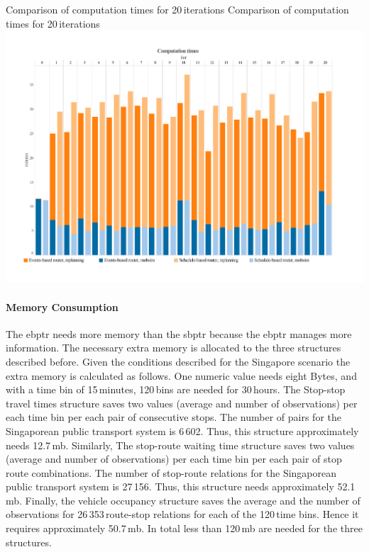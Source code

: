 \createfigure
{Comparison of computation times for 20\,iterations}
{Comparison of computation times for 20\,iterations}
{\label{fig:CompTimes}}
{\includegraphics[width=1.0\textwidth]{extending/figures/ebr/ComputationTimes.pdf}}
{}

\paragraph{Memory Consumption}

The \gls{ebptr} needs more memory than the \gls{sbptr} because the \gls{ebptr} manages more information. The necessary extra memory is allocated to the three structures described before. Given the conditions described for the Singapore scenario the extra memory is calculated as follows. One numeric value needs eight Bytes, and with a time bin of 15\,minutes, 120\,bins are needed for 30\,hours. The Stop-stop travel times structure saves two values (average and number of observations) per each time bin per each pair of consecutive stops. The number of pairs for the Singaporean public transport system is 6\,602. Thus, this structure approximately needs 12.7\,\gls{mb}. Similarly, The stop-route waiting time structure saves two values (average and number of observations) per each time bin per each pair of stop route combinations. The number of stop-route relations for the Singaporean public transport system is 27\,156. Thus, this structure needs approximately 52.1\,\gls{mb}. Finally, the vehicle occupancy structure saves the average and the number of observations for 26\,353\,route-stop relations for each of the 120\,time bins. Hence it requires approximately 50.7\,\gls{mb}. In total less than 120\,\gls{mb} are needed for the three structures.


